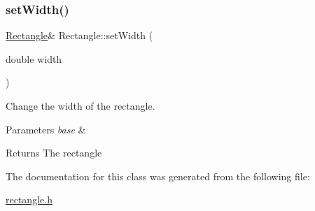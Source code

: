 \subsubsection{\texorpdfstring{set\+Width()}{setWidth()}}
{\footnotesize\ttfamily \hyperlink{classRectangle}{Rectangle}\& Rectangle\+::set\+Width (\begin{DoxyParamCaption}\item[{double}]{width }\end{DoxyParamCaption})}



Change the width of the rectangle. 


\begin{DoxyParams}{Parameters}
{\em base} & \\
\hline
\end{DoxyParams}
\begin{DoxyReturn}{Returns}
The rectangle 
\end{DoxyReturn}


The documentation for this class was generated from the following file\+:\begin{DoxyCompactItemize}
\item 
\hyperlink{rectangle_8h}{rectangle.\+h}\end{DoxyCompactItemize}
